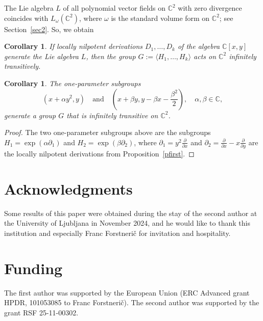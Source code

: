 \documentclass[a4paper,draft,reqno,12pt]{amsart}
\newtheorem{corollary}[theorem]{Corollary}
\theoremstyle{definition}
\theoremstyle{remark}
\def\CC{{\mathbb C}}
\begin{document}
\smallskip

The Lie algebra $L$ of all polynomial vector fields on $\CC^2$ with zero divergence coincides with $L_{\omega}(\CC^2)$, where $\omega$ is the standard volume form on $\CC^2$; see Section~\ref{sec2}. So, we obtain 

\begin{corollary}
If locally nilpotent derivations $D_1,\ldots, D_k$  of the algebra $\CC[x,y]$ generate the Lie algebra $L$, then the group $G:=\langle H_1,\ldots, H_k\rangle$ acts on $\CC^2$ infinitely transitively.   
\end{corollary} 

\begin{corollary} \label{two} 
The one-parameter subgroups
$$
(x+\alpha y^2, y) \quad \text{and} \quad (x+\beta y, y-\beta x -\frac{\beta^2}{2}),  \quad \alpha, \beta \in \CC,
$$
generate a group $G$ that is infinitely transitive on $\CC^2$. 
\end{corollary}

\begin{proof}
The two one-parameter subgroups above are the subgroups ${H_1=\exp(\alpha\partial_1)}$ and ${H_2=\exp(\beta\partial_2)}$, where 
$\partial_1= y^2\frac{\partial}{\partial x} $ and $\partial_2= \frac{\partial}{\partial x}-x\frac{\partial}{\partial y}$ are the locally nilpotent derivations from Proposition~\ref{pfirst}.
\end{proof} 

\section*{Acknowledgments}

Some results of this paper were obtained during the stay of the second author at the University of Ljubljana in November 2024, and he would like to thank this institution and especially 
Franc Forstneri\v c for invitation and hospitality. 

\section*{Funding}

The first author was supported by the European Union (ERC Advanced grant HPDR, 101053085 to Franc Forstneri\v{c}). The second author was supported by the grant RSF 25-11-00302.

\end{document}
